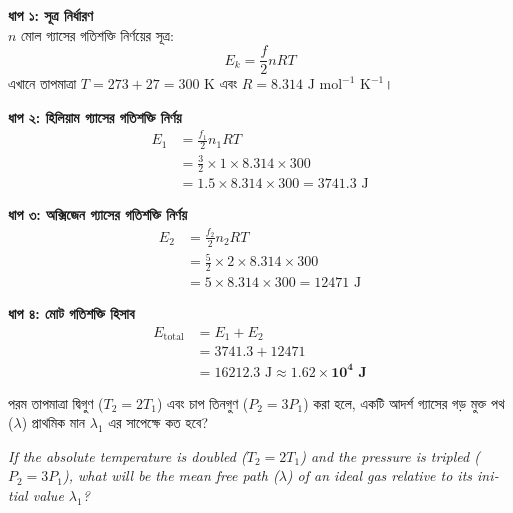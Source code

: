 \documentclass[12pt, a4paper]{article}
\begin{document}
\begin{tcolorbox}[solutionbox={সমাধান (Solution)}]
    \noindent
    \textbf{ধাপ ১: সূত্র নির্ধারণ} \\
    $n$ মোল গ্যাসের গতিশক্তি নির্ণয়ের সূত্র:
    \[ E_k = \frac{f}{2} n R T \]
    এখানে তাপমাত্রা $T = 273 + 27 = 300\text{ K}$ এবং $R = 8.314\text{ J mol}^{-1}\text{ K}^{-1}$।
    
    \vspace{0.4em}
    \noindent\textbf{ধাপ ২: হিলিয়াম গ্যাসের গতিশক্তি নির্ণয়}
    \begin{align*}
        E_1 &= \frac{f_1}{2} n_1 R T \\
        &= \frac{3}{2} \times 1 \times 8.314 \times 300 \\
        &= 1.5 \times 8.314 \times 300 = 3741.3\text{ J}
    \end{align*}
    
    \vspace{0.4em}
    \noindent\textbf{ধাপ ৩: অক্সিজেন গ্যাসের গতিশক্তি নির্ণয়}
    \begin{align*}
        E_2 &= \frac{f_2}{2} n_2 R T \\
        &= \frac{5}{2} \times 2 \times 8.314 \times 300 \\
        &= 5 \times 8.314 \times 300 = 12471\text{ J}
    \end{align*}
    
    \vspace{0.4em}
    \noindent\textbf{ধাপ ৪: মোট গতিশক্তি হিসাব}
    \begin{align*}
        E_{\text{total}} &= E_1 + E_2 \\
        &= 3741.3 + 12471 \\
        &= 16212.3\text{ J} \approx \mathbf{1.62 \times 10^4\text{ J}}
    \end{align*}
\end{tcolorbox}

\vspace{2em}

\begin{tcolorbox}[questionbox={প্রশ্ন (Question) 9}]
    \noindent
    পরম তাপমাত্রা দ্বিগুণ ($T_2 = 2T_1$) এবং চাপ তিনগুণ ($P_2 = 3P_1$) করা হলে, একটি আদর্শ গ্যাসের গড় মুক্ত পথ ($\lambda$) প্রাথমিক মান $\lambda_1$ এর সাপেক্ষে কত হবে?
    
    \vspace{0.8em}
    \begin{english}
    \noindent\textit{\color{darkgray}
    If the absolute temperature is doubled ($T_2 = 2T_1$) and the pressure is tripled ($P_2 = 3P_1$), what will be the mean free path ($\lambda$) of an ideal gas relative to its initial value $\lambda_1$?
    }
    \end{english}
\end{tcolorbox}
\end{document}
